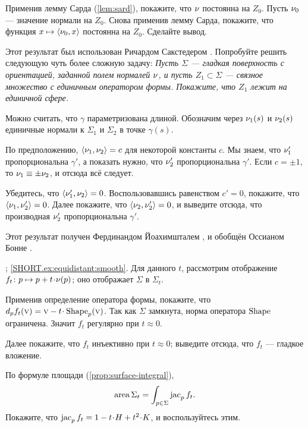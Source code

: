 \begin{multicols}{2}
\medskip

Применив лемму Сарда (\ref{lem:sard}), покажите, что $\nu$ постоянна на $Z_0$.
Пусть $\nu_0$ --- значение нормали на $Z_0$.
Снова применив лемму Сарда, покажите, что функция $x\mapsto \langle \nu_0,x\rangle$ постоянна на $Z_0$.
Сделайте вывод.

Этот результат был использован Ричардом Сакстедером \cite[Lemma 6]{sacksteder}.  
Попробуйте решить следующую чуть более сложную задачу:  
\textit{Пусть $\Sigma$ --- гладкая поверхность с ориентацией, заданной полем нормалей $\nu$, и пусть $Z_1\subset \Sigma$ --- связное множество с единичным оператором формы.  
Покажите, что $Z_1$ лежит на единичной сфере.}


Можно считать, что $\gamma$ параметризована длиной.
Обозначим через $\nu_1(s)$ и $\nu_2(s)$ единичные нормали к $\Sigma_1$ и $\Sigma_2$ в точке $\gamma(s)$.

По предположению, $\langle \nu_1,\nu_2\rangle= c$ для некоторой константы $c$.
Мы знаем, что
$\nu_1'$ пропорциональна $\gamma'$, а показать нужно, что $\nu_2'$ пропорциональна $\gamma'$.
Если $c=\pm1$, то $\nu_1\equiv\pm \nu_2$, и отсюда всё следует.

Убедитесь, что $\langle\nu_1',\nu_2\rangle=0$.
Воспользовавшись равенством $c'=0$, покажите, что $\langle\nu_1,\nu_2'\rangle=0$.
Далее покажите, что $\langle\nu_2,\nu_2'\rangle=0$, и выведите отсюда, что производная $\nu_2'$ пропорциональна $\gamma'$.

Этот результат получен Фердинандом Йоахимшталем \cite{joachimsthal}, и обобщён Оссианом Бонне \cite{bonnet}.

\parbf{\ref{ex:equidistant}};
\ref{SHORT.ex:equidistant:smooth}.
Для данного $t$, рассмотрим  отображение $f_t\:p\mapsto p+t\cdot\Norm(p)$; оно отображает $\Sigma$ в $\Sigma_t$.

Применив определение оператора формы, покажите, что $d_pf_t(\vec v)=\vec v-t\cdot\Shape_p(\vec v)$.
Так как $\Sigma$ замкнута, норма оператора $\mathop{\rm Shape}\nolimits$ ограничена.
Значит $f_t$ регулярно при $t\approx 0$.

Далее покажите, что $f_t$ инъективно при $t\approx0$;
выведите отсюда, что $f_t$ --- гладкое вложение.

По формуле площади (\ref{prop:surface-integral}), 
\[\mathop{\rm area}\nolimits\Sigma_t=\int_{p\in \Sigma}\mathop{\rm jac}\nolimits_pf_t.\]
Покажите, что $\jac_pf_t=1-t\cdot H+t^2\cdot K$, и воспользуйтесь этим.


\end{multicols}
